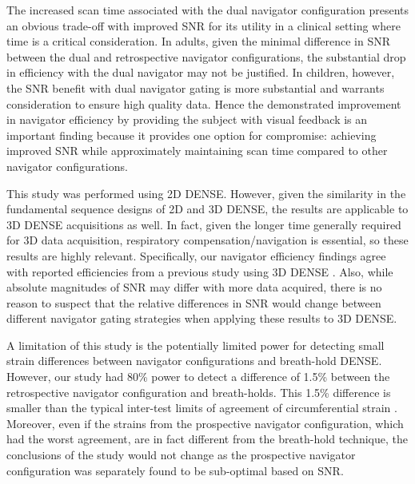 	The increased scan time associated with the dual navigator configuration presents an obvious trade-off with improved SNR for its utility in a clinical setting where time is a critical consideration. In adults, given the minimal difference in SNR between the dual and retrospective navigator configurations, the substantial drop in efficiency with the dual navigator may not be justified. In children, however, the SNR benefit with dual navigator gating is more substantial and warrants consideration to ensure high quality data. Hence the demonstrated improvement in navigator efficiency by providing the subject with visual feedback is an important finding because it provides one option for compromise: achieving improved SNR while approximately maintaining scan time compared to other navigator configurations.
	
	This study was performed using 2D DENSE. However, given the similarity in the fundamental sequence designs of 2D and 3D DENSE, the results are applicable to 3D DENSE acquisitions as well. In fact, given the longer time generally required for 3D data acquisition, respiratory compensation/navigation is essential, so these results are highly relevant. Specifically, our navigator efficiency findings agree with reported efficiencies from a previous study using 3D DENSE \cite{Zhong2010a}. Also, while absolute magnitudes of SNR may differ with more data acquired, there is no reason to suspect that the relative differences in SNR would change between different navigator gating strategies when applying these results to 3D DENSE.
	
	A limitation of this study is the potentially limited power for detecting small strain differences between navigator configurations and breath-hold DENSE. However, our study had 80\% power to detect a difference of 1.5\% between the retrospective navigator configuration and breath-holds. This 1.5\% difference is smaller than the typical inter-test limits of agreement of circumferential strain \cite{Wehner2015a}. Moreover, even if the strains from the prospective navigator configuration, which had the worst agreement, are in fact different from the breath-hold technique, the conclusions of the study would not change as the prospective navigator configuration was separately found to be sub-optimal based on SNR.
	
